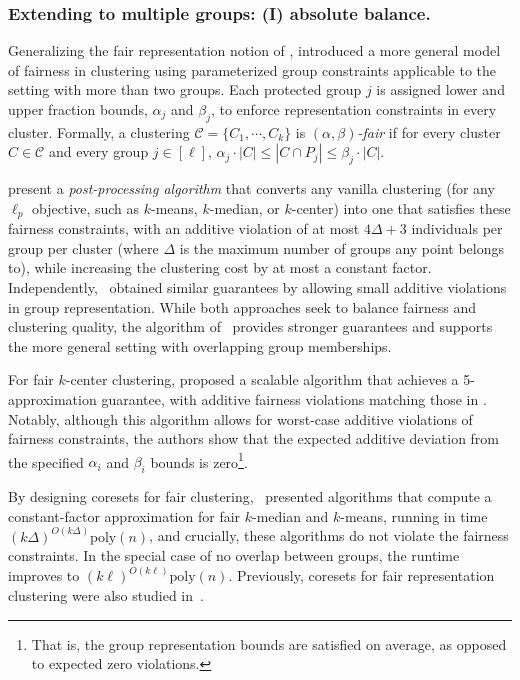 \subsubsection{Extending to multiple groups: (I) absolute balance.} 
Generalizing the fair representation notion of \citet{DBLP:conf/nips/Chierichetti0LV17}, \citet{bera2019fair} introduced a more general model of fairness in clustering using parameterized group constraints applicable to the setting with more than two groups. Each protected group $j$ is assigned lower and upper fraction bounds, $\alpha_j$ and $\beta_j$, to enforce representation constraints in every cluster. Formally, a clustering $\mathcal{C} = \{C_1, \cdots, C_k\}$ is {\em $(\alpha, \beta)$-fair} if for every cluster $C\in \mathcal{C}$ and every group $j\in [\ell]$, $\alpha_j \cdot |C| \le |C \cap P_j| \le \beta_j \cdot |C|$. 


\citet{bera2019fair} present a \emph{post-processing algorithm} that converts any vanilla clustering (for any $\ell_p$ objective, such as $k$-means, $k$-median, or $k$-center) into one that satisfies these fairness constraints, with an additive violation of at most $4\Delta + 3$ individuals per group per cluster (where $\Delta$ is the maximum number of groups any point belongs to), while increasing the clustering cost by at most a constant factor. Independently,~\citet{DBLP:conf/approx/Bercea0KKRS019} obtained similar guarantees by allowing small additive violations in group representation. While both approaches seek to balance fairness and clustering quality, the algorithm of~\citet{bera2019fair} provides stronger guarantees and supports the more general setting with overlapping group memberships.

For fair $k$-center clustering, \citet{DBLP:conf/nips/HarbL20} proposed a scalable algorithm that achieves a 5-approximation guarantee, with additive fairness violations matching those in \citet{bera2019fair}. Notably, although this algorithm allows for worst-case additive violations of fairness constraints, the authors show that the expected additive deviation from the specified $\alpha_i$ and $\beta_i$ bounds is zero\footnote{That is, the group representation bounds are satisfied on average, as opposed to expected zero violations.}. 

By designing coresets for fair clustering,~\citet{DBLP:conf/icalp/BandyapadhyayFS21} presented algorithms that compute a constant-factor approximation for fair $k$-median and $k$-means, running in time $(k\Delta)^{O(k\Delta)} \mathrm{poly}(n)$, and crucially, these algorithms do not violate the fairness constraints. In the special case of no overlap between groups, the runtime improves to $(k\ell)^{O(k\ell)} \mathrm{poly}(n)$. Previously, coresets for fair representation clustering were also studied in~\citep{DBLP:conf/waoa/0001SS19,DBLP:conf/nips/HuangJV19}.


